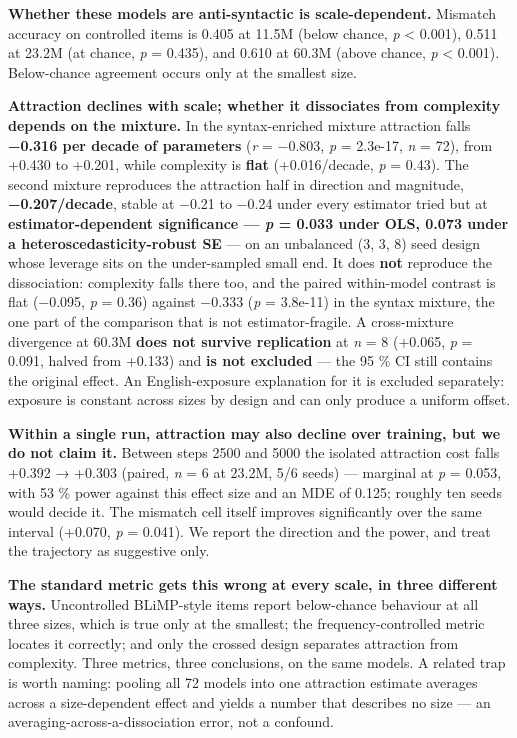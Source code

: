 \documentclass{article}
\begin{document}
\textbf{Whether these models are anti-syntactic is scale-dependent.} Mismatch accuracy on
controlled items is 0.405 at 11.5M (below chance, \emph{p} \textless{} 0.001), 0.511 at 23.2M (at chance,
\emph{p} = 0.435), and 0.610 at 60.3M (above chance, \emph{p} \textless{} 0.001). Below-chance agreement occurs
only at the smallest size.

\textbf{Attraction declines with scale; whether it dissociates from complexity depends on the
mixture.} In the syntax-enriched mixture attraction falls \textbf{−0.316 per decade of
parameters} (\emph{r} = −0.803, \emph{p} = 2.3e-17, \emph{n} = 72), from +0.430 to +0.201, while complexity
is \textbf{flat} (+0.016/decade, \emph{p} = 0.43). The second mixture reproduces the attraction half
in direction and magnitude, \textbf{−0.207/decade}, stable at −0.21 to −0.24 under every
estimator tried but at \textbf{estimator-dependent significance --- \emph{p} = 0.033 under OLS, 0.073
under a heteroscedasticity-robust SE} --- on an unbalanced (3, 3, 8) seed design whose
leverage sits on the under-sampled small end. It does \textbf{not} reproduce the dissociation:
complexity falls there too, and the paired within-model contrast is flat (−0.095,
\emph{p} = 0.36) against −0.333 (\emph{p} = 3.8e-11) in the syntax mixture, the one part of the
comparison that is not estimator-fragile. A cross-mixture divergence at 60.3M \textbf{does not
survive replication} at \emph{n} = 8 (+0.065, \emph{p} = 0.091, halved from +0.133) and \textbf{is not
excluded} --- the 95 \% CI still contains the original effect. An English-exposure explanation
for it is excluded separately: exposure is constant across sizes by design and can only
produce a uniform offset.

\textbf{Within a single run, attraction may also decline over training, but we do not claim it.}
Between steps 2500 and 5000 the isolated attraction cost falls +0.392 → +0.303 (paired,
\emph{n} = 6 at 23.2M, 5/6 seeds) --- marginal at \emph{p} = 0.053, with 53 \% power against this effect
size and an MDE of 0.125; roughly ten seeds would decide it. The mismatch cell itself
improves significantly over the same interval (+0.070, \emph{p} = 0.041). We report the direction
and the power, and treat the trajectory as suggestive only.

\textbf{The standard metric gets this wrong at every scale, in three different ways.} Uncontrolled
BLiMP-style items report below-chance behaviour at all three sizes, which is true only at the
smallest; the frequency-controlled metric locates it correctly; and only the crossed design
separates attraction from complexity. Three metrics, three conclusions, on the same models.
A related trap is worth naming: pooling all 72 models into one attraction estimate averages
across a size-dependent effect and yields a number that describes no size --- an
averaging-across-a-dissociation error, not a confound.
\end{document}

